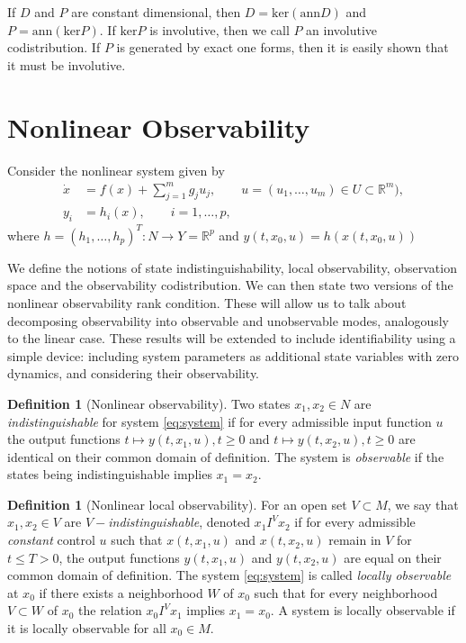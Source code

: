 \documentclass[psamsfonts]{amsart}
\theoremstyle{definition}
\newtheorem{defn}[thm]{Definition}
\theoremstyle{remark}
\newcommand*\R{\mathds{R}}
\numberwithin{equation}{section}
\begin{document}
If $D$ and $P$ are constant dimensional, then $D = \text{ker}( \text{ann} D)$ and $P = \text{ann}(\text{ker} P)$. If $\text{ker} P$ is involutive, then we call $P$ an involutive codistribution. If $P$ is generated by exact one forms, then it is easily shown that it must be involutive. 


\section{Nonlinear Observability}
Consider the nonlinear system given by 
\begin{equation}
    \begin{aligned}
        \dot x & = {} f(x) + \sum_{j = 1}^m g_j u_j, \qquad u = (u_1, \dots, u_m) \in U\subset \R^m), \\
        y_i & = {} h_i(x), \qquad i = 1, \dots, p,
    \end{aligned}\label{eq:system}
\end{equation}
where $h = (h_1, \dots, h_p)^T:N\rightarrow Y=\R^p$ and $y(t, x_0, u) = h(x(t, x_0, u))$

We define the notions of state indistinguishability, local observability, observation space and the observability codistribution. We can then state two versions of the nonlinear observability rank condition. These will allow us to talk about decomposing observability into observable and unobservable modes, analogously to the linear case. These results will be extended to include identifiability using a simple device: including system parameters as additional state variables with zero dynamics, and considering their observability. 

\begin{defn}[Nonlinear observability]
    Two states $x_1, x_2\in N$ are \textit{indistinguishable} for system \eqref{eq:system} if for every admissible input function $u$ the output functions $t\mapsto y(t, x_1, u), t\geq 0$ and $t\mapsto y(t, x_2, u), t\geq 0$ are identical on their common domain of definition. The system is \textit{observable} if the states being indistinguishable implies $x_1=x_2$. 
\end{defn}

\begin{defn}[Nonlinear local observability]
    For an open set $V\subset M$, we say that $x_1, x_2 \in V$ are \textit{$V-$indistinguishable}, denoted $x_1 I^V x_2$ if for every admissible \textit{constant} control $u$ such that $x(t, x_1, u)$ and $x(t, x_2, u)$ remain in $V$ for $t\leq T > 0$, the output functions $y(t, x_1, u)$ and $y(t, x_2, u)$ are equal on their common domain of definition. The system \eqref{eq:system} is called \textit{locally observable} at $x_0$ if there exists a neighborhood $W$ of $x_0$ such that for every neighborhood $V\subset W$ of $x_0$ the relation $x_0 I^V x_1$ implies $x_1 = x_0$. A system is locally observable if it is locally observable for all $x_0 \in M$. 
\end{defn}
\end{document}
